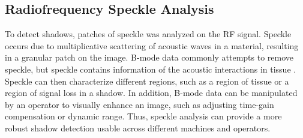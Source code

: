 \documentclass[preprint,5p,authoryear]{elsarticle}
\begin{document}
\begin{table}
	\caption{Transducer properties for different imaging scenarios}
	\begin{center}
\end{center}
\end{table}


\subsection*{Radiofrequency Speckle Analysis}      
To detect shadows, patches of speckle was analyzed on the RF signal. Speckle occurs due to multiplicative scattering of acoustic waves in a material, resulting in a granular patch on the image. B-mode data commonly attempts to remove speckle, but speckle contains information of the acoustic interactions in tissue \citep{Burckhardt1978}. Speckle can then characterize different regions, such as a region of tissue or a region of signal loss in a shadow. In addition, B-mode data can be manipulated by an operator to visually enhance an image, such as adjusting time-gain compensation or dynamic range. Thus, speckle analysis can provide a more robust shadow detection usable across different machines and operators.
\end{document}
